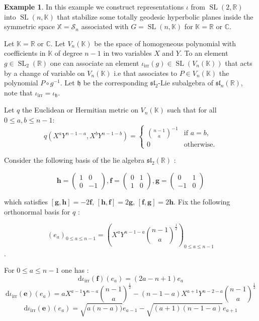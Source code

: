 \documentclass[reqno,10pt]{amsart}
\theoremstyle{plain}
\theoremstyle{definition}
\newtheorem{exmp}[thm]{Example}
\theoremstyle{remark}
\newcommand{\R}{\mathbb{R}}
\newcommand{\C}{\mathbb{C}}
\newcommand{\K}{\mathbb{K}}
\DeclareMathOperator{\SL}{SL}
\newcommand{\X}{\mathbb{X}}
\begin{document}
\begin{exmp}
\label{exmp:PSL2N}
In this example we construct representations $\iota$ from $\SL(2,\R)$ into $\SL(n,\mathbb{K})$ that stabilize some totally geodesic hyperbolic planes inside  the symmetric space $\X=\mathcal{S}_n$ associated with $G=\SL(n,\K)$ for $\mathbb{K}=\R$ or $\C$.

\medskip
Let $\mathbb{K}=\mathbb{R}$ or $\mathbb{C}$. Let $V_n(\mathbb{K})$ be the space of homogeneous polynomial with coefficients in $\mathbb{K}$ of degree $n-1$ in two variables $X$ and $Y$. To an element $g\in \SL_2(\mathbb{R})$ one can associate an element $\iota_\text{irr}(g)\in \SL\left(V_n(\mathbb{K})\right)$ that acts by a change of variable on $V_n(\mathbb{K})$ i.e that associates to $P\in V_n(\mathbb{K})$ the polynomial $P\circ g^{-1}$. Let $\mathfrak{h}$ be the corresponding $\mathfrak{sl}_2$-Lie subalgebra of $\mathfrak{sl}_n(\R)$, note that $\iota_\text{irr}=\iota_\mathfrak{h}$. 

\medskip

Let $q$ the Euclidean or Hermitian metric on $V_n(\mathbb{K})$ such that for all $0\leq a,b\leq n-1$:
 $$q\left(X^aY^{n-1-a},X^bY^{n-1-b}\right)=\begin{cases}
    \binom{n-1}{a} ^{-1}& \text{if } a=b,\\
    0            & \text{otherwise}.
\end{cases}$$


Consider the following basis of the lie algebra $\mathfrak{sl}_2(\mathbb{R})$ :

$$\mathbf{h}=\begin{pmatrix}
1 & 0 \\
0 & -1 
\end{pmatrix}, \mathbf{f}=\begin{pmatrix}
0 & 1 \\
1 & 0 
\end{pmatrix} , \mathbf{g}=\begin{pmatrix}
0 & 1 \\
-1 & 0 
\end{pmatrix}$$

which satisfies $[\mathbf{g},\mathbf{h}]=-2\mathbf{f}$, $[\mathbf{h},\mathbf{f}]=2\mathbf{g}$, $[\mathbf{f},\mathbf{g}]=2\mathbf{h}$.
Fix the following orthonormal basis for $q$ :

 $$(e_a)_{0\leq a\leq n-1}=\left(X^aY^{n-1-a}\binom{n-1}{a}^{\frac{1}{2}}\right)_{0\leq a\leq n-1}$$.
 
 For $0\leq a\leq n-1$ one has :
$$\mathrm{d}\iota_\text{irr}(\mathbf{f})(e_a)=(2a-n+1)e_a$$
$$\mathrm{d}\iota_\text{irr}(\mathbf{e})(e_a)=aX^{a-1}Y^{n-a}\binom{n-1}{a}^{\frac{1}{2}} - (n-1-a)X^{a+1}Y^{n-2-a}\binom{n-1}{a}^{\frac{1}{2}}$$
$$\mathrm{d}\iota_\text{irr}(\mathbf{e})(e_a)=\sqrt{a(n-a))}e_{a-1} - \sqrt{(a+1)(n-1-a)}e_{a+1}$$


\end{exmp}
\end{document}
